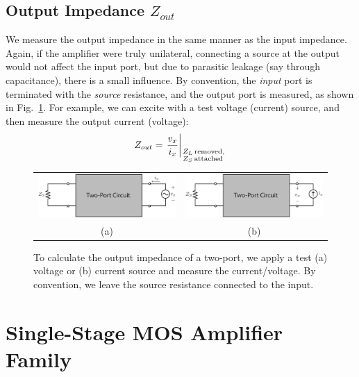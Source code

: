 \subsection{Output Impedance $Z_{out}$}


We measure the output impedance in the same manner as the input impedance.  Again, if the amplifier were truly unilateral, connecting a source at the output would not affect the input port, but due to parasitic leakage (say through capacitance), there is a small influence.  By convention, the \textit{input} port is terminated with the \textit{source} resistance, and the output port is measured, as shown in Fig.~\ref{fig:2port_zout_vx}.
For example, we can excite with a test voltage (current) source, and then measure the output current (voltage):
%
\begin{equation}
	{Z_{out}} = {\left. {\frac{{{v_x}}}{{{i_x}}}} \right|_{\scriptstyle{Z_L}\,\text{removed},\hfill\atop
	\scriptstyle{Z_S}\,\text{attached}\hfill}}
\end{equation}
%

\begin{figure}[tb]
\begin{center}
\begin{tabular}{cc}
\includegraphics[width=.5\columnwidth]{2port_zout_vx} &
\includegraphics[width=.5\columnwidth]{2port_zout_ix} \\
(a) & (b) \\
\end{tabular}
\end{center}
\caption{To calculate the output impedance of a two-port, we apply a test (a) voltage or (b) current source and measure the current/voltage.  By convention, we leave the source resistance connected to the input.} \label{fig:2port_zout_vx}
\end{figure}




\section{Single-Stage MOS Amplifier Family}

